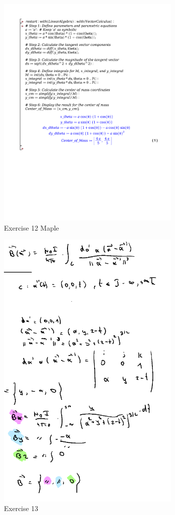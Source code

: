 \documentclass[a4paper]{article}
\begin{document}
\begin{figure}[H]
	\centering
	\includegraphics[width=0.8\textwidth]{exercises/huis_6_ex_12.pdf}
	\caption{Exercise 12 Maple}
	\label{fig:huis_6_ex_12_maple}
\end{figure}


\begin{figure}[H]
	\centering
	\includegraphics[width=0.8\textwidth]{assets/huis_6_ex_13.png}
	\caption{Exercise 13}
	\label{fig:huis_6_ex_13}
\end{figure}
\end{document}
